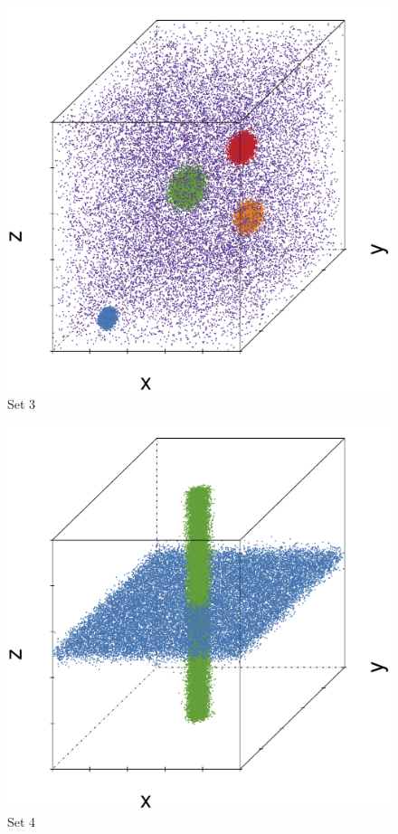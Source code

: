 \begin{subfigure}{0.18\textwidth}
	\centering
	\includegraphics[width=\textwidth]{3/img/datasetplot_ferdosi_3_60000.pdf}
	\caption{Set 3}
	\label{fig:3:simulated:datasets:ferdosi3}
\end{subfigure}		
\begin{subfigure}{0.18\textwidth}
	\centering
	\includegraphics[width=\textwidth]{3/img/datasetplot_ferdosi_4_60000.pdf}
	\caption{Set 4}
	\label{fig:3:simulated:datasets:ferdosi4}
\end{subfigure}			
